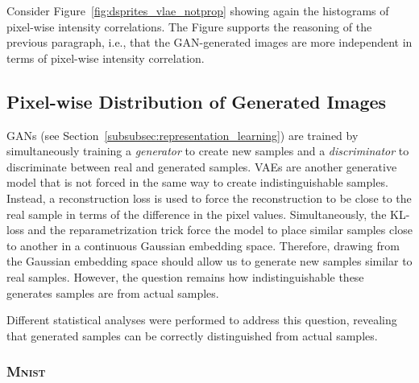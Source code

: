 Consider Figure~\ref{fig:dsprites_vlae_notprop} showing again the histograms of pixel-wise intensity correlations.
The Figure supports the reasoning of the previous paragraph, i.e., that the \ac{GAN}-generated images are more independent in terms of pixel-wise intensity correlation.

\subsection{Pixel-wise Distribution of Generated Images}\label{subsubsec:pixel_wise_statistics}

\acp{GAN} (see Section~\ref{subsubsec:representation_learning}) are trained by simultaneously training a \textit{generator} to create new samples and a \textit{discriminator} to discriminate between real and generated samples.
\acp{VAE} are another generative model that is not forced in the same way to create indistinguishable samples.
Instead, a reconstruction loss is used to force the reconstruction to be close to the real sample in terms of the difference in the pixel values.
Simultaneously, the \ac{KL}-loss and the reparametrization trick force the model to place similar samples close to another in a continuous Gaussian embedding space.
Therefore, drawing from the Gaussian embedding space should allow us to generate new samples similar to real samples.
However, the question remains how indistinguishable these generates samples are from actual samples.

Different statistical analyses were performed to address this question, revealing that generated samples can be correctly distinguished from actual samples.

\subsubsection{\textsc{Mnist}}\label{subsubsec:pixel_wise_distribution_mnist}


